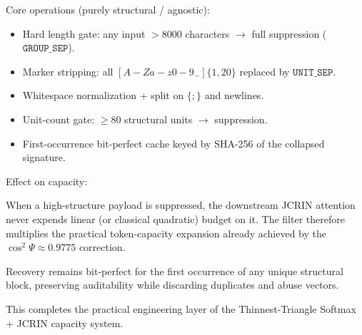 Core operations (purely structural / agnostic):

\begin{itemize}
  \item Hard length gate: any input \(> 8000\) characters \(\rightarrow\) full suppression (\(\mathtt{GROUP\_SEP}\)).
  \item Marker stripping: all \([A-Za-z0-9_-]\{1,20\}\) replaced by \(\mathtt{UNIT\_SEP}\).
  \item Whitespace normalization + split on \(\{;\}\) and newlines.
  \item Unit-count gate: \(\ge 80\) structural units \(\rightarrow\) suppression.
  \item First-occurrence bit-perfect cache keyed by SHA-256 of the collapsed signature.
\end{itemize}

Effect on capacity:

When a high-structure payload is suppressed, the downstream JCRIN attention never expends linear (or classical quadratic) budget on it. The filter therefore multiplies the practical token-capacity expansion already achieved by the \(\cos^2\Psi \approx 0.9775\) correction.

Recovery remains bit-perfect for the first occurrence of any unique structural block, preserving auditability while discarding duplicates and abuse vectors.

This completes the practical engineering layer of the Thinnest-Triangle Softmax + JCRIN capacity system.
